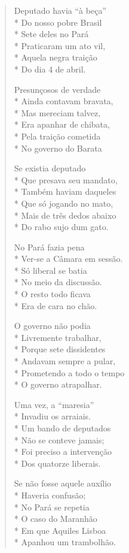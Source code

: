 \begin{verse}
Deputado havia “à beça”\\*
Do nosso pobre Brasil\\*
Sete deles no Pará\\*
Praticaram um ato vil,\\*
Aquela negra traição\\*
Do dia 4 de abril.

Presunçosos de verdade\\*
Ainda contavam bravata,\\*
Mas mereciam talvez,\\*
Era apanhar de chibata,\\*
Pela traição cometida\\*
No governo do Barata

Se existia deputado\\*
Que presava seu mandato,\\*
Também haviam daqueles\\*
Que só jogando no mato,\\*
Mais de três dedos abaixo\\*
Do rabo sujo dum gato.

No Pará fazia pena\\*
Ver-se a Câmara em sessão.\\*
Só liberal se batia\\*
No meio da discussão.\\*
O resto todo ficava\\*
Era de cara no chão.

O governo não podia\\*
Livremente trabalhar,\\*
Porque sete dissidentes\\*
Andavam sempre a pular,\\*
Prometendo a todo o tempo\\*
O governo atrapalhar.

Uma vez, a “maresia”\\*
Invadiu os arraiais.\\*
Um bando de deputados\\*
Não se conteve jamais;\\*
Foi preciso a intervenção\\*
Dos quatorze liberais.

Se não fosse aquele auxílio\\*
Haveria confusão;\\*
No Pará se repetia\\*
O caso do Maranhão\\*
Em que Aquiles Lisboa\\*
Apanhou um trambolhão.


\end{verse}
